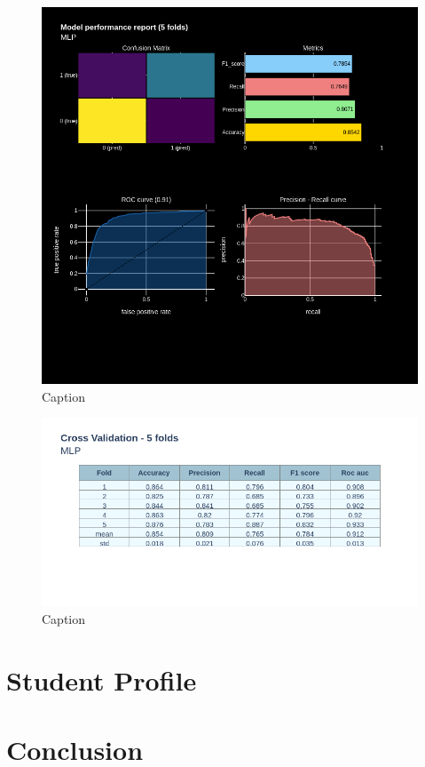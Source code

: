 \documentclass[12pt]{article}
\begin{document}
\begin{figure}[ht]
\centering
\includegraphics[width=1\textwidth]{newplot(43).png}
\caption{\label{fig:50} Caption}
\end{figure}

\begin{figure}[ht]
\centering
\includegraphics[width=1\textwidth]{newplot(44).png}
\caption{\label{fig:51} Caption}
\end{figure}


\clearpage
\newpage
\section{Student Profile}

\clearpage
\newpage
\section{Conclusion}
\newpage


\nocite{*}
\end{document}
